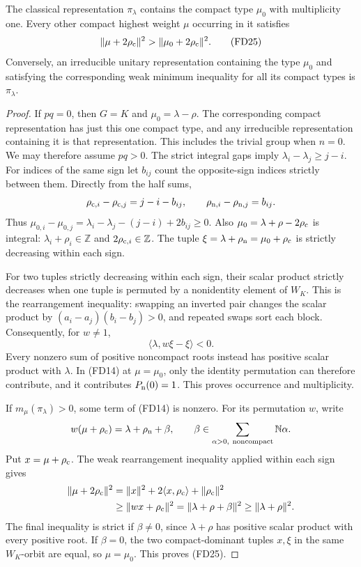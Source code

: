 \begin{proposition}\label{fd-lowest-type}
The classical representation $\pi_\lambda$ contains the
compact type $\mu_0$ with multiplicity one. Every other
compact highest weight $\mu$ occurring in it satisfies
\[
             \|\mu+2\rho_{\rm c}\|^2
                        >\|\mu_0+2\rho_{\rm c}\|^2.
 \tag{FD25}
\]
Conversely, an irreducible unitary representation containing
the type $\mu_0$ and satisfying the corresponding weak
minimum inequality for all its compact types is
$\pi_\lambda$.
\end{proposition}
\begin{proof}
If $pq=0$, then $G=K$ and $\mu_0=\lambda-\rho$.
The corresponding compact representation has just this
one compact type, and any irreducible representation
containing it is that representation. This includes the
trivial group when $n=0$. We may therefore assume $pq>0$.
The strict integral gaps imply $\lambda_i-\lambda_j\ge j-i$.
For indices of the same sign let $b_{ij}$ count the
opposite-sign indices strictly between them. Directly
from the half sums,
\[
 \rho_{{\rm c},i}-\rho_{{\rm c},j}=j-i-b_{ij},\qquad
 \rho_{{\rm n},i}-\rho_{{\rm n},j}=b_{ij}.
\]
Thus
$\mu_{0,i}-\mu_{0,j}=\lambda_i-\lambda_j-(j-i)+2b_{ij}\ge0$.
Also $\mu_0=\lambda+\rho-2\rho_{\rm c}$ is integral:
$\lambda_i+\rho_i\in\mathbb Z$ and
$2\rho_{{\rm c},i}\in\mathbb Z$.
The tuple $\xi=\lambda+\rho_{\rm n}=\mu_0+\rho_{\rm c}$
is strictly decreasing within each sign.

For two tuples strictly decreasing within each sign, their
scalar product strictly decreases when one tuple is
permuted by a nonidentity element of $W_K$.
This is the rearrangement inequality: swapping an inverted
pair changes the scalar product by
$(a_i-a_j)(b_i-b_j)>0$, and repeated swaps sort each block.
Consequently, for $w\ne1$,
\[
                       \langle\lambda,w\xi-\xi\rangle<0.
\]
Every nonzero sum of positive noncompact roots instead
has positive scalar product with $\lambda$.
In (FD14) at $\mu=\mu_0$, only the identity permutation
can therefore contribute, and it contributes
$P_{\rm n}(0)=1$. This proves occurrence and multiplicity.

If $m_\mu(\pi_\lambda)>0$, some term of (FD14) is nonzero.
For its permutation $w$, write
\[
          w(\mu+\rho_{\rm c})=\lambda+\rho_{\rm n}+\beta,
 \qquad \beta\in\sum_{\alpha>0,\ {\rm noncompact}}\mathbb N\alpha.
\]
Put $x=\mu+\rho_{\rm c}$. The weak rearrangement
inequality applied within each sign gives
\begin{align*}
 \|\mu+2\rho_{\rm c}\|^2
   &=\|x\|^2+2\langle x,\rho_{\rm c}\rangle+\|\rho_{\rm c}\|^2\\
   &\ge\|wx+\rho_{\rm c}\|^2
     =\|\lambda+\rho+\beta\|^2
     \ge\|\lambda+\rho\|^2.
\end{align*}
The final inequality is strict if $\beta\ne0$, since
$\lambda+\rho$ has positive scalar product with every
positive root. If $\beta=0$, the two compact-dominant
tuples $x,\xi$ in the same $W_K$-orbit are equal, so
$\mu=\mu_0$. This proves (FD25).


\end{proof}
